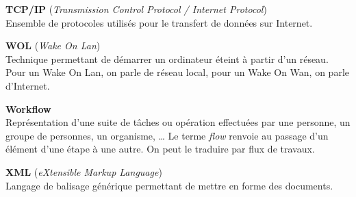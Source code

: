 \textbf{TCP/IP} (\textit{Transmission Control Protocol / Internet Protocol})\\
Ensemble de protocoles utilis\'es pour le transfert de donn\'ees sur Internet.

\vspace{0.5cm}

\textbf{WOL} (\textit{Wake On Lan})\\
Technique permettant de d\'emarrer un ordinateur \'eteint \`a partir d'un r\'eseau. 
Pour un Wake On Lan, on parle de r\'eseau local, pour un Wake On Wan, on parle d'Internet.

\vspace{0.5cm}

\textbf{Workflow}\\
Repr\'esentation d'une suite de t\^aches ou op\'eration effectu\'ees par une personne, un groupe de personnes, un organisme, \ldots{}
Le terme \textit{flow} renvoie au passage d'un \'el\'ement d'une \'etape \`a une autre.
On peut le traduire par \og{}flux de travaux\fg{}.

\vspace{0.5cm}

\textbf{XML} (\textit{eXtensible Markup Language})\\
Langage de balisage g\'en\'erique permettant de mettre en forme des documents.



\clearpage
